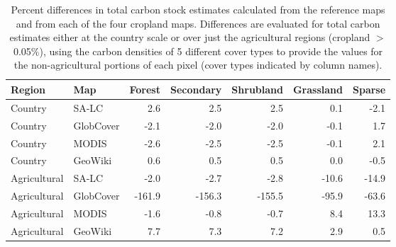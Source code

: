 \begin{table}[ht]
\centering
\caption{Percent differences in total carbon stock estimates calculated from the reference maps and from each of the four cropland maps. Differences are evaluated for total carbon estimates either at the country scale or over just the agricultural regions (cropland $>$0.05\%), using the carbon densities of 5 different cover types to provide the values for the non-agricultural portions of each pixel (cover types indicated by column names).} 
\begin{tabular}{llrrrrr}
  \hline
Region & Map & Forest & Secondary & Shrubland & Grassland & Sparse \\ 
  \hline
Country & SA-LC & 2.6 & 2.5 & 2.5 & 0.1 & -2.1 \\ 
  Country & GlobCover & -2.1 & -2.0 & -2.0 & -0.1 & 1.7 \\ 
  Country & MODIS & -2.6 & -2.5 & -2.5 & -0.1 & 2.1 \\ 
  Country & GeoWiki & 0.6 & 0.5 & 0.5 & 0.0 & -0.5 \\ 
  Agricultural & SA-LC & -2.0 & -2.7 & -2.8 & -10.6 & -14.9 \\ 
  Agricultural & GlobCover & -161.9 & -156.3 & -155.5 & -95.9 & -63.6 \\ 
  Agricultural & MODIS & -1.6 & -0.8 & -0.7 & 8.4 & 13.3 \\ 
  Agricultural & GeoWiki & 7.7 & 7.3 & 7.2 & 2.9 & 0.5 \\ 
   \hline
\end{tabular}
\end{table}
